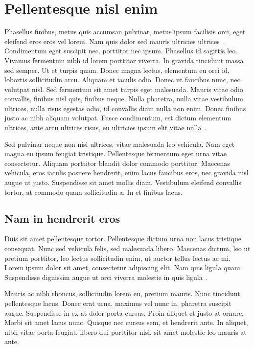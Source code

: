 \chapter{Pellentesque nisl enim}
Phasellus finibus, metus quis accumsan pulvinar, metus ipsum facilisis orci, eget eleifend eros eros vel lorem. Nam quis dolor sed mauris ultricies ultrices~\cite{Berestova}. Condimentum eget suscipit nec, porttitor nec ipsum. Phasellus id sagittis leo. Vivamus fermentum nibh id lorem porttitor viverra. In gravida tincidunt massa sed semper. Ut et turpis quam. Donec magna lectus, elementum eu orci id, lobortis sollicitudin arcu. Aliquam et iaculis odio. Donec ut faucibus nunc, nec volutpat nisl. Sed fermentum sit amet turpis eget malesuada. Mauris vitae odio convallis, finibus nisl quis, finibus neque. Nulla pharetra, nulla vitae vestibulum ultrices, nulla risus egestas odio, id convallis diam nulla non enim. Donec finibus justo ac nibh aliquam volutpat. Fusce condimentum, est dictum elementum ultrices, ante arcu ultrices risus, eu ultricies ipsum elit vitae nulla~\cite{Book}.

Sed pulvinar neque non nisl ultrices, vitae malesuada leo vehicula. Nam eget magna eu ipsum feugiat tristique. Pellentesque fermentum eget urna vitae consectetur. Aliquam porttitor blandit dolor commodo porttitor. Maecenas vehicula, eros iaculis posuere hendrerit, enim lacus faucibus eros, nec gravida nisl augue ut justo. Suspendisse sit amet mollis diam. Vestibulum eleifend convallis tortor, at commodo quam sollicitudin a. In et finibus lacus.

\section{Nam in hendrerit eros}
Duis sit amet pellentesque tortor. Pellentesque dictum urna non lacus tristique consequat. Nunc sed vehicula felis, sed malesuada libero. Maecenas dictum, leo ut pretium porttitor, leo lectus sollicitudin enim, ut auctor tellus lectus ac mi. Lorem ipsum dolor sit amet, consectetur adipiscing elit. Nam quis ligula quam. Suspendisse dignissim augue ut orci viverra molestie in quis ligula~\cite{Conference}. 

Mauris ac nibh rhoncus, sollicitudin lorem eu, pretium mauris. Nunc tincidunt pellentesque lacus. Donec erat urna, maximus vel nunc in, pharetra suscipit augue. Suspendisse in ex at dolor porta cursus. Proin aliquet et justo at ornare. Morbi sit amet lacus nunc. Quisque nec cursus sem, et hendrerit ante. In aliquet, nibh vitae porta feugiat, libero dui porttitor nisi, sit amet molestie leo mauris at ante.
